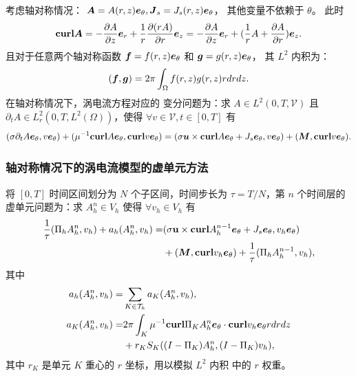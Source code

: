 \documentclass[notheorems,serif]{beamer}
\begin{document}
\begin{frame}
考虑轴对称情况：
$\boldsymbol{A} = A(r, z) \boldsymbol{e}_\theta, \boldsymbol{J}_s = J_s(r, z) \boldsymbol{e}_{\theta}$，
其他变量不依赖于 $\theta$。
此时
$$
\mathbf{curl} \boldsymbol{A} = -\frac{\partial A}{\partial z} \boldsymbol{e}_r + \frac{1}{r}
\frac{\partial (rA)}{\partial r} \boldsymbol{e}_z = - \frac{\partial A}{\partial
z} \boldsymbol{e}_r + (\frac{1}{r}A + \frac{\partial A}{\partial r}) \boldsymbol{e}_z.
$$
且对于任意两个轴对称函数 $\boldsymbol{f} = f(r, z)\boldsymbol{e}_\theta$ 和 $\boldsymbol{g} = g(r, z)\boldsymbol{e}_{\theta}$，
其 $L^2$ 内积为：
\begin{equation}
\label{innerproduct}    
(\boldsymbol{f}, \boldsymbol{g}) = 2\pi\int_{\Omega} f(r, z) g(r, z) r dr dz.
\end{equation}
在轴对称情况下，涡电流方程对应的
变分问题为：求 $A \in L^2(0, T, \mathcal{V})$ 且 $\partial_t A \in L^2_r(0, T,
L^2(\Omega))$，使得
$\forall v \in \mathcal{V}, t \in [0, T]$ 有
\small
$$
(\sigma\partial_t A\boldsymbol{e}_{\theta}, v\boldsymbol{e}_{\theta}) +
(\mu^{-1}\mathbf{curl} A\boldsymbol{e}_{\theta}, \mathbf{curl} v\boldsymbol{e}_{\theta}) =
(\sigma\boldsymbol{u}\times \mathbf{curl} A\boldsymbol{e}_{\theta} + J_s\boldsymbol{e}_{\theta}, v\boldsymbol{e}_{\theta}) 
+ (\boldsymbol{M}, \mathbf{curl} v\boldsymbol{e}_{\theta}).
$$
\end{frame}

\begin{frame}
  \frametitle{轴对称情况下的涡电流模型的虚单元方法}
将 $[0, T]$ 时间区间划分为 $N$ 个子区间，时间步长为 $\tau = T/N$，第
$n$ 个时间层的虚单元问题为：求 $A_h^n \in V_h$ 使得 
$\forall v_h \in V_h$ 有
\begin{equation}
\label{vemaxial}
\begin{aligned}
\frac{1}{\tau}
(\Pi_h A_h^n, v_h) + 
a_h(A_h^n, v_h) = & (\sigma\mathbf{u}\times \mathbf{curl} A_h^{n-1} \boldsymbol{e}_{\theta} +
    J_s\boldsymbol{e}_{\theta}, v_h\boldsymbol{e}_{\theta})\\ 
& + (\boldsymbol{M}, \mathbf{curl} v_h\boldsymbol{e}_{\theta})
 + \frac{1}{\tau}(\Pi_h A_h^{n-1}, v_h),
\end{aligned}
\end{equation}
其中
$$
\begin{aligned}
    a_h(A_h^n, v_h) = & \sum_{K\in \mathcal{T}_h} a_K(A^n_h, v_h),\\
    a_K(A^n_h, v_h) = & 2\pi\int_{K} \mu^{-1}\mathbf{curl}
\Pi_K A_h^n\boldsymbol{e}_{\theta} \cdot\mathbf{curl} v_h\boldsymbol{e}_{\theta} r d r d z\\
&  + r_KS_K((I-\Pi_K)A_h^n, (I-\Pi_K)v_h),
\end{aligned}
$$
其中 $r_K$ 是单元 $K$ 重心的 $r$ 坐标，用以模拟 $L^2$ 内积
中的 $r$ 权重。
\end{frame}
\end{document}
